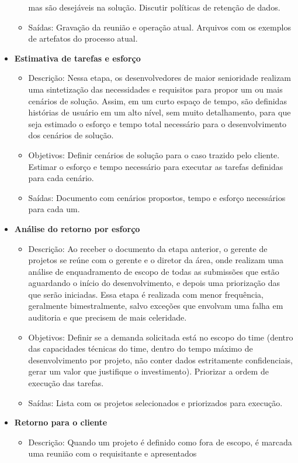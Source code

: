 \begin{itemize}
\begin{itemize}
			mas são desejáveis na solução. Discutir políticas de retenção de dados.
			\item Saídas: Gravação da reunião e operação atual. Arquivos com os exemplos de artefatos do processo atual.
		\end{itemize}
		\item \textbf{Estimativa de tarefas e esforço}
		\begin{itemize}
			\item Descrição: Nessa etapa, os desenvolvedores de maior senioridade realizam uma sintetização das necessidades e requisitos para propor
			um ou mais cenários de solução. Assim, em um curto espaço de tempo, são definidas histórias de usuário em um alto nível, sem muito detalhamento,
			para que seja estimado o esforço e tempo total necessário para o desenvolvimento dos cenários de solução. 
			\item Objetivos: Definir cenários de solução para o caso trazido pelo cliente. Estimar o esforço e tempo necessário para executar as tarefas definidas para cada cenário.
			\item Saídas: Documento com cenários propostos, tempo e esforço necessários para cada um. 
		\end{itemize}
		\item \textbf{Análise do retorno por esforço}
		\begin{itemize}
			\item Descrição: Ao receber o documento da etapa anterior, o gerente de projetos se reúne com o gerente e o diretor da área,
			onde realizam uma análise de enquadramento de escopo de todas as submissões que estão aguardando o início do desenvolvimento, e 
			depois uma priorização das que serão iniciadas. Essa etapa é realizada com menor frequência,
			geralmente bimestralmente, salvo exceções que envolvam uma falha em auditoria e que precisem de mais celeridade.
			\item Objetivos: Definir se a demanda solicitada está no escopo do time (dentro das capacidades técnicas do time, dentro do tempo máximo de desenvolvimento por projeto, não conter
			dados estritamente confidenciais, gerar um valor que justifique o investimento). Priorizar a ordem de execução das tarefas.
			\item Saídas: Lista com os projetos selecionados e priorizados para execução.
		\end{itemize}
		\item \textbf{Retorno para o cliente}
		\begin{itemize}
			\item Descrição: Quando um projeto é definido como fora de escopo, é marcada uma reunião com o requisitante e apresentados 

\end{itemize}
\end{itemize}
